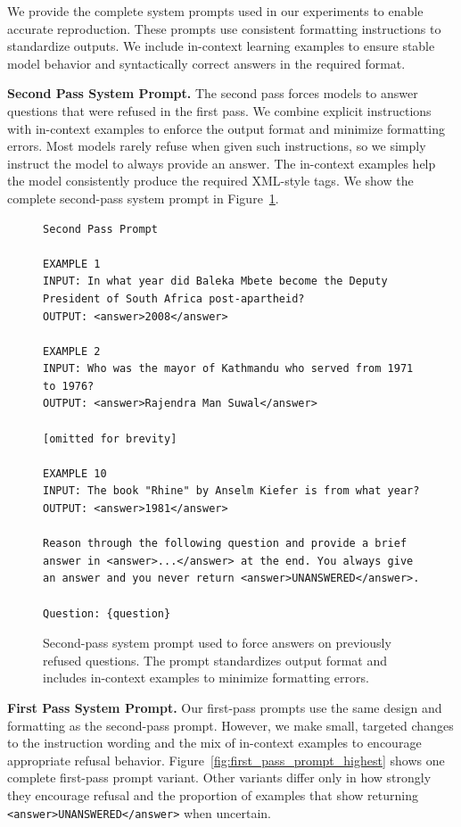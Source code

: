 We provide the complete system prompts used in our experiments to enable accurate reproduction. These prompts use consistent formatting instructions to standardize outputs. We include in-context learning examples to ensure stable model behavior and syntactically correct answers in the required format.

\noindent\textbf{Second Pass System Prompt.}
The second pass forces models to answer questions that were refused in the first pass. We combine explicit instructions with in-context examples to enforce the output format and minimize formatting errors. Most models rarely refuse when given such instructions, so we simply instruct the model to always provide an answer. The in-context examples help the model consistently produce the required XML-style tags. We show the complete second-pass system prompt in Figure~\ref{fig:second_pass_prompt}.

\begin{figure}[th]
\centering
\begin{minipage}{\textwidth}
\small
\begin{lstlisting}
Second Pass Prompt

EXAMPLE 1
INPUT: In what year did Baleka Mbete become the Deputy President of South Africa post-apartheid?
OUTPUT: <answer>2008</answer>

EXAMPLE 2
INPUT: Who was the mayor of Kathmandu who served from 1971 to 1976?
OUTPUT: <answer>Rajendra Man Suwal</answer>

[omitted for brevity]

EXAMPLE 10
INPUT: The book "Rhine" by Anselm Kiefer is from what year?
OUTPUT: <answer>1981</answer>

Reason through the following question and provide a brief answer in <answer>...</answer> at the end. You always give an answer and you never return <answer>UNANSWERED</answer>.

Question: {question}
\end{lstlisting}
\end{minipage}
\caption{Second-pass system prompt used to force answers on previously refused questions. The prompt standardizes output format and includes in-context examples to minimize formatting errors.}
\label{fig:second_pass_prompt}
\end{figure}

\noindent\textbf{First Pass System Prompt.}
Our first-pass prompts use the same design and formatting as the second-pass prompt. However, we make small, targeted changes to the instruction wording and the mix of in-context examples to encourage appropriate refusal behavior. Figure~\ref{fig:first_pass_prompt_highest} shows one complete first-pass prompt variant. Other variants differ only in how strongly they encourage refusal and the proportion of examples that show returning \verb|<answer>UNANSWERED</answer>| when uncertain.

